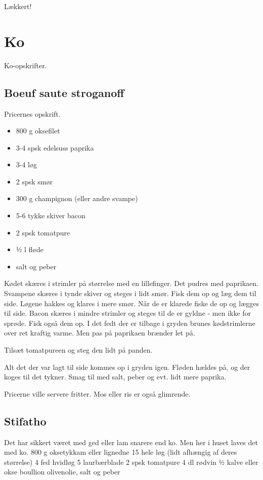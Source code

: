 \documentclass[
]{book}
\providecommand{\tightlist}{%
  \setlength{\itemsep}{0pt}\setlength{\parskip}{0pt}}
\begin{document}
Lækkert!

\chapter{Ko}\label{ko}

Ko-opskrifter.

\section{Boeuf saute stroganoff}\label{boeuf-saute-stroganoff}

Pricernes opskrift.

\begin{itemize}
\tightlist
\item
  800 g oksefilet
\item
  3-4 spsk edelsuss paprika
\item
  3-4 løg
\item
  2 spsk smør
\item
  300 g champignon (eller andre svampe)
\item
  5-6 tykke skiver bacon
\item
  2 spsk tomatpure
\item
  ½ l fløde
\item
  salt og peber
\end{itemize}

Kødet skæres i strimler på størrelse med en lillefinger. Det pudres med
paprikaen.
Svampene skæres i tynde skiver og steges i lidt smør. Fisk dem op og læg
dem til side.
Løgene hakkes og klares i mere smør. Når de er klarede fiske de op og lægges
til side.
Bacon skæres i mindre strimler og steges til de er gyldne - men ikke for
sprøde. Fisk også dem op.
I det fedt der er tilbage i gryden brunes kødstrimlerne over ret kraftig varme. Men pas på paprikaen brænder let på.

Tilsæt tomatpureen og steg den lidt på panden.

Alt det der var lagt til side kommes op i gryden
igen. Fløden hældes på, og der koges til det
tykner. Smag til med salt, peber og evt. lidt
mere paprika.

Pricerne ville servere fritter. Mos eller ris
er også glimrende.

\section{Stifatho}\label{stifatho}

Det har sikkert været med ged eller lam snarere end ko. Men her i huset laves det med ko.
800 g oksetykkam eller lignedne
15 hele løg (lidt afhængig af deres størrelse)
4 fed hvidløg
5 laurbærblade
2 spsk tomatpure
4 dl rødvin
½ kalve eller okse boullion
olivenolie, salt og peber
\end{document}
